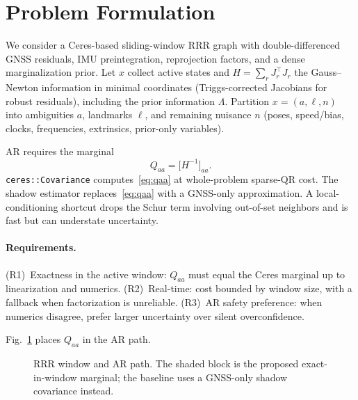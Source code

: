 \documentclass[letterpaper, journal, twocolumn]{IEEEtran}
\begin{document}
\section{Problem Formulation}
\label{sec:problem}

We consider a Ceres-based sliding-window RRR graph with double-differenced
GNSS residuals, IMU preintegration, reprojection factors, and a dense
marginalization prior.
Let $x$ collect active states and $H=\sum_r J_r^\top J_r$ the Gauss--Newton
information in minimal coordinates (Triggs-corrected Jacobians for robust
residuals), including the prior information $\Lambda$.
Partition $x=(a,\ell,n)$ into ambiguities $a$, landmarks $\ell$, and remaining
nuisance $n$ (poses, speed/bias, clocks, frequencies, extrinsics, prior-only
variables).

AR requires the marginal
\begin{equation}
\label{eq:qaa}
Q_{aa} = \bigl[H^{-1}\bigr]_{aa}.
\end{equation}
\texttt{ceres::Covariance} computes~\eqref{eq:qaa} at whole-problem sparse-QR
cost.
The shadow estimator replaces~\eqref{eq:qaa} with a GNSS-only approximation.
A local-conditioning shortcut drops the Schur term involving out-of-set
neighbors and is fast but can understate uncertainty.

\paragraph{Requirements.}
(R1)~Exactness in the active window: $Q_{aa}$ must equal the Ceres marginal up
to linearization and numerics.
(R2)~Real-time: cost bounded by window size, with a fallback when factorization
is unreliable.
(R3)~AR safety preference: when numerics disagree, prefer larger uncertainty
over silent overconfidence.

Fig.~\ref{fig:arch} places $Q_{aa}$ in the AR path.

\begin{figure}[!t]
\centering
{}
\caption{RRR window and AR path. The shaded block is the proposed
exact-in-window marginal; the baseline uses a GNSS-only shadow covariance
instead.}
\label{fig:arch}
\end{figure}
\end{document}
